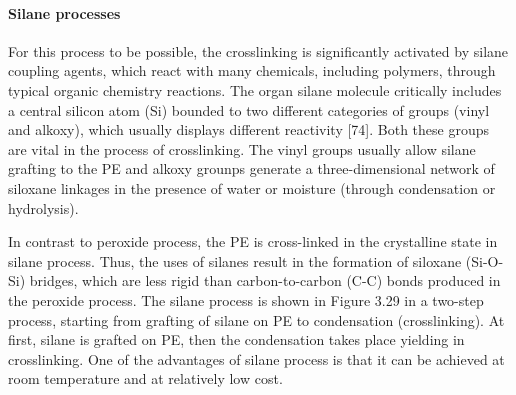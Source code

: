 \documentclass[12pt]{report}
\begin{document}

\paragraph{Silane processes}
For this process to be possible, the crosslinking is significantly activated by silane coupling agents, which react with many chemicals, including polymers, through typical organic chemistry reactions. The organ silane molecule critically includes a central silicon atom (Si) bounded to two different categories of groups (vinyl and alkoxy), which usually displays different reactivity [74]. Both these groups are vital in the process of crosslinking. The vinyl groups usually allow silane grafting to the PE and alkoxy grounps generate a three-dimensional network of siloxane linkages in the presence of water or moisture (through condensation or hydrolysis). 

In contrast to peroxide process, the PE is cross-linked in the crystalline state in silane process. Thus, the uses of silanes result in the formation of siloxane (Si-O-Si) bridges, which are less rigid than carbon-to-carbon (C-C) bonds produced in the peroxide process. The silane process is shown in Figure 3.29 in a two-step process, starting from grafting of silane on PE to condensation (crosslinking). At first, silane is grafted on PE, then the condensation takes place yielding in crosslinking. One of the advantages of silane process is that it can be achieved at room temperature and at relatively low cost. 

\end{document}
